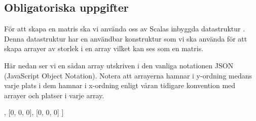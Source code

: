 \subsection{Obligatoriska uppgifter}





        För att skapa en matris ska vi använda oss av Scalas inbyggda datastruktur .
        Denna datastruktur har en användbar konstruktur  som vi ska använda för att skapa
         arrayer av storlek  i en array vilket kan ses som en matris.

        Här nedan ser vi en sådan array utskriven i den vanliga notationen JSON (JavaScript Object Notation).
        Notera att arrayerna hamnar i y-ordning medans varje plats i dem hamnar i x-ordning enligt våran tidigare
        konvention med  arrayer och  platser i varje array.

\begin{Code}
[
    [0, 0, 0],
    [0, 0, 0],
    [0, 0, 0]
]
\end{Code}





